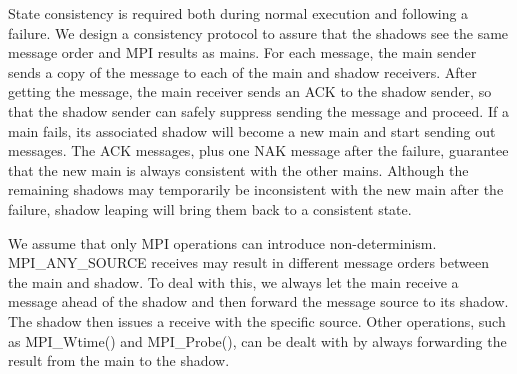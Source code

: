 State consistency is required both during normal execution and following a failure. %
We design a consistency protocol %
to assure 
that the shadows see the same message order and MPI results as mains. %
For each message, the main sender sends a copy of the message to each of the main and shadow receivers. After getting the message, the main receiver sends an ACK to the shadow sender, so that the shadow sender can safely suppress sending the message and proceed. If a main fails,
its associated shadow will become a new main and start sending out messages. The ACK messages, plus one NAK message after the failure, guarantee that the new main is always consistent with the other mains. 
Although the remaining shadows may temporarily be inconsistent with the new main after the failure, shadow leaping will bring them back to a consistent state.


We assume that only MPI operations can introduce non-determinism. MPI\_ANY\_SOURCE receives may result in different message orders between the main and shadow. To deal with this, we always let the main receive a message ahead of the shadow and then forward the message source to its shadow. %
The shadow then issues a receive with the specific source. Other operations, such as MPI\_Wtime() and MPI\_Probe(), can be dealt with by always forwarding the result from the main to the shadow.

